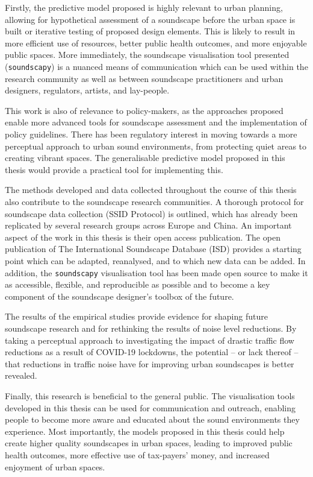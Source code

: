 \documentclass[twoside,fontsize=11pt,titlepage,chapterprefix=true
]{scrbook}
\begin{document}
Firstly, the predictive model proposed is highly relevant to urban planning, allowing for hypothetical assessment of a soundscape before the urban space is built or iterative testing of proposed design elements. This is likely to result in more efficient use of resources, better public health outcomes, and more enjoyable public spaces. More immediately, the soundscape visualisation tool presented (\texttt{soundscapy}) is a nuanced means of communication which can be used within the research community as well as between soundscape practitioners and urban designers, regulators, artists, and lay-people.

This work is also of relevance to policy-makers, as the approaches proposed enable more advanced tools for soundscape assessment and the implementation of policy guidelines. There has been regulatory interest in moving towards a more perceptual approach to urban sound environments, from protecting quiet areas to creating vibrant spaces. The generalisable predictive model proposed in this thesis would provide a practical tool for implementing this. 

The methods developed and data collected throughout the course of this thesis also contribute to the soundscape research communities. A thorough protocol for soundscape data collection (SSID Protocol) is outlined, which has already been replicated by several research groups across Europe and China. An important aspect of the work in this thesis is their open access publication. The open publication of The International Soundscape Database (ISD) provides a starting point which can be adapted, reanalysed, and to which new data can be added. In addition, the \texttt{soundscapy} visualisation tool has been made open source to make it as accessible, flexible, and reproducible as possible and to become a key component of the soundscape  designer's toolbox of the future. 

The results of the empirical studies provide evidence for shaping future soundscape research and for rethinking the results of noise level reductions. By taking a perceptual approach to investigating the impact of drastic traffic flow reductions as a result of COVID-19 lockdowns, the potential -- or lack thereof -- that reductions in traffic noise have for improving urban soundscapes is better revealed. 

Finally, this research is beneficial to the general public. The visualisation tools developed in this thesis can be used for communication and outreach, enabling people to become more aware and educated about the sound environments they experience. Most importantly, the models proposed in this thesis could help create higher quality soundscapes in urban spaces, leading to improved public health outcomes, more effective use of tax-payers' money, and increased enjoyment of urban spaces. 
\end{document}
